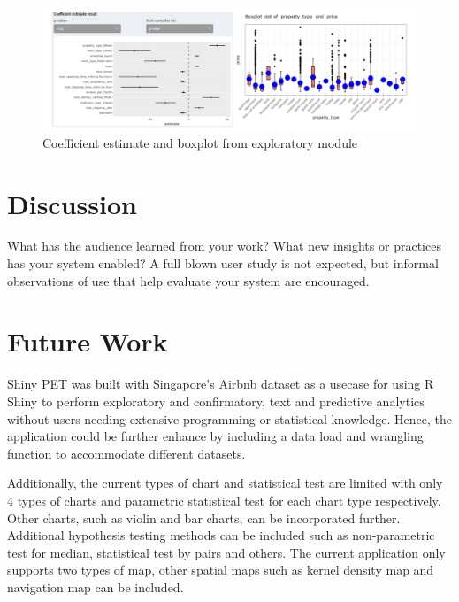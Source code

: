 \documentclass{acm_proc_article-sp}
\begin{document}
\begin{figure}[H]

{\centering \includegraphics[width=1\linewidth]{images/LMcoeff} 

}

\caption{Coefficient estimate and boxplot from exploratory module}\label{fig:unnamed-chunk-14}
\end{figure}

\hypertarget{discussion}{%
\section{Discussion}\label{discussion}}

What has the audience learned from your work? What new insights or
practices has your system enabled? A full blown user study is not
expected, but informal observations of use that help evaluate your
system are encouraged.

\hypertarget{future-work}{%
\section{Future Work}\label{future-work}}

Shiny PET was built with Singapore's Airbnb dataset as a usecase for
using R Shiny to perform exploratory and confirmatory, text and
predictive analytics without users needing extensive programming or
statistical knowledge. Hence, the application could be further enhance
by including a data load and wrangling function to accommodate different
datasets.

Additionally, the current types of chart and statistical test are
limited with only 4 types of charts and parametric statistical test for
each chart type respectively. Other charts, such as violin and bar
charts, can be incorporated further. Additional hypothesis testing
methods can be included such as non-parametric test for median,
statistical test by pairs and others. The current application only
supports two types of map, other spatial maps such as kernel density map
and navigation map can be included.
\end{document}
